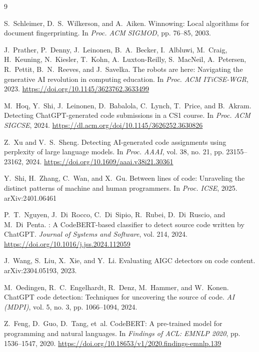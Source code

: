 \documentclass[sigconf]{acmart}
\begin{document}
\begin{thebibliography}{9}

S.~Schleimer, D.~S.~Wilkerson, and A.~Aiken.
\newblock Winnowing: Local algorithms for document fingerprinting.
\newblock In \textit{Proc. ACM SIGMOD}, pp. 76--85, 2003.

J.~Prather, P.~Denny, J.~Leinonen, B.~A.~Becker, I.~Albluwi, M.~Craig, H.~Keuning, N.~Kiesler, T.~Kohn, A.~Luxton-Reilly, S.~MacNeil, A.~Petersen, R.~Pettit, B.~N.~Reeves, and J.~Savelka.
\newblock The robots are here: Navigating the generative AI revolution in computing education.
\newblock In \textit{Proc. ACM ITiCSE-WGR}, 2023.
\newblock \url{https://doi.org/10.1145/3623762.3633499}

M.~Hoq, Y.~Shi, J.~Leinonen, D.~Babalola, C.~Lynch, T.~Price, and B.~Akram.
\newblock Detecting ChatGPT-generated code submissions in a CS1 course.
\newblock In \textit{Proc. ACM SIGCSE}, 2024.
\newblock \url{https://dl.acm.org/doi/10.1145/3626252.3630826}

Z.~Xu and V.~S.~Sheng.
\newblock Detecting AI-generated code assignments using perplexity of large language models.
\newblock In \textit{Proc. AAAI}, vol. 38, no. 21, pp. 23155--23162, 2024.
\newblock \url{https://doi.org/10.1609/aaai.v38i21.30361}

Y.~Shi, H.~Zhang, C.~Wan, and X.~Gu.
\newblock Between lines of code: Unraveling the distinct patterns of machine and human programmers.
\newblock In \textit{Proc. ICSE}, 2025.
\newblock arXiv:2401.06461

P.~T.~Nguyen, J.~Di~Rocco, C.~Di~Sipio, R.~Rubei, D.~Di~Ruscio, and M.~Di~Penta.
: A {CodeBERT}-based classifier to detect source code written by {ChatGPT}.
\newblock \textit{Journal of Systems and Software}, vol. 214, 2024.
\newblock \url{https://doi.org/10.1016/j.jss.2024.112059}

J.~Wang, S.~Liu, X.~Xie, and Y.~Li.
\newblock Evaluating AIGC detectors on code content.
\newblock arXiv:2304.05193, 2023.

M.~Oedingen, R.~C.~Engelhardt, R.~Denz, M.~Hammer, and W.~Konen.
\newblock ChatGPT code detection: Techniques for uncovering the source of code.
\newblock \textit{AI (MDPI)}, vol. 5, no. 3, pp. 1066--1094, 2024.

Z.~Feng, D.~Guo, D.~Tang, et~al.
\newblock CodeBERT: A pre-trained model for programming and natural languages.
\newblock In \textit{Findings of ACL: EMNLP 2020}, pp. 1536--1547, 2020.
\newblock \url{https://doi.org/10.18653/v1/2020.findings-emnlp.139}

\end{thebibliography}
\end{document}
